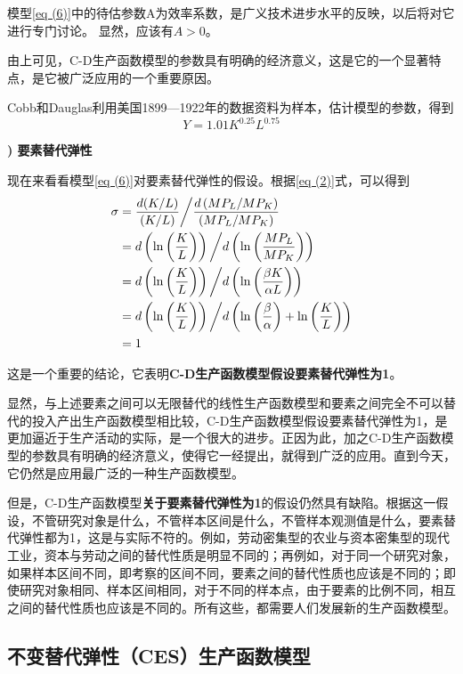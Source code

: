 	模型\eqref{eq (6)}中的待估参数A为效率系数，是广义技术进步水平的反映，以后将对它进行专门讨论。
	显然，应该有$ A > 0 $。
		
	由上可见，C-D生产函数模型的参数具有明确的经济意义，这是它的一个显著特点，是它被广泛应用的一个重要原因。
		
	Cobb和Dauglas利用美国1899—1922年的数据资料为样本，估计模型的参数，得到
	$$ Y = 1.01K^{0.25}L^{0.75} $$

	{\bf {}) 要素替代弹性}
	
	现在来看看模型\eqref{eq (6)}对要素替代弹性的假设。根据\eqref{eq (2)}式，可以得到
	\begin{equation}
		\begin{aligned}
			\sigma & = \frac{d(K / L)}{(K / L)} \bigg/ \frac{d\left(M P_{L} / M P_{K}\right)}{\left(M P_{L} / M P_{K}\right)} \\
			& = d\left(\ln \left(\frac{K}{L}\right)\right) \bigg/ d\left(\ln \left(\frac{M P_{L}}{M P_{K}}\right)\right) \\
			& = d\left(\ln \left(\frac{K}{L}\right)\right) \bigg/ d\left(\ln \left(\frac{\beta K}{\alpha L}\right)\right) \\
			& = d\left(\ln \left(\frac{K}{L}\right)\right) \bigg/ d\left(\ln \left(\frac{\beta}{\alpha}\right)+\ln \left(\frac{K}{L}\right)\right) \\
			& = 1 \notag
		\end{aligned}
	\end{equation}

	这是一个重要的结论，它表明\textbf{C-D生产函数模型假设要素替代弹性为1}。
		
	显然，与上述要素之间可以无限替代的线性生产函数模型和要素之间完全不可以替代的投入产出生产函数模型相比较，C-D生产函数模型假设要素替代弹性为1，是更加逼近于生产活动的实际，是一个很大的进步。正因为此，加之C-D生产函数模型的参数具有明确的经济意义，使得它一经提出，就得到广泛的应用。直到今天，它仍然是应用最广泛的一种生产函数模型。
		
	但是，C-D生产函数模型\textbf{关于要素替代弹性为1}的假设仍然具有缺陷。根据这一假设，不管研究对象是什么，不管样本区间是什么，不管样本观测值是什么，要素替代弹性都为1，这是与实际不符的。例如，劳动密集型的农业与资本密集型的现代工业，资本与劳动之间的替代性质是明显不同的；再例如，对于同一个研究对象，如果样本区间不同，即考察的区间不同，要素之间的替代性质也应该是不同的；即使研究对象相同、样本区间相同，对于不同的样本点，由于要素的比例不同，相互之间的替代性质也应该是不同的。所有这些，都需要人们发展新的生产函数模型。
	

\subsection{不变替代弹性（CES）生产函数模型}
		
